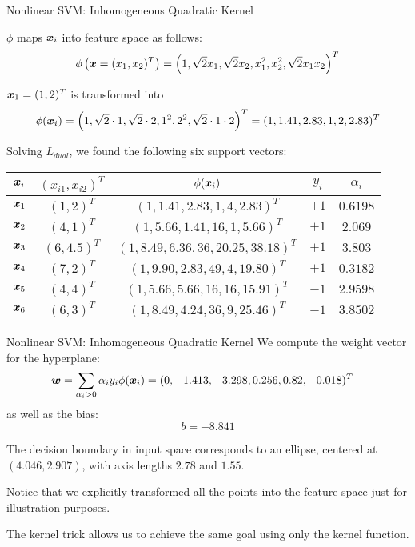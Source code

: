 \begin{frame}{Nonlinear SVM: Inhomogeneous Quadratic Kernel}

    $\phi$ maps ${\boldsymbol x}_i$ into feature space as follows:
    \begin{align*}
    \phi\left({\boldsymbol x} = (x_{1},x_{2})^T\right) = \left(1, \sqrt{2}x_{1},
    \sqrt{2}x_{2}, x_{1}^2, x_{2}^2, \sqrt{2}x_{1}x_{2}\right)^T
    \end{align*}

 ${\boldsymbol x}_1 = (1,2)^T$ is transformed into 
$$\phi({\boldsymbol x}_i) = \left(1, \sqrt{2}\cdot1, \sqrt{2}\cdot2, 1^2, 2^2, \sqrt{2}\cdot1\cdot2\right)^T = (1,1.41, 2.83, 1, 2, 2.83)^T$$


Solving $L_{dual}$, we found the following six support vectors:
    \begin{center}
    {\renewcommand{\arraystretch}{1.1}\begin{tabular}{|c||c|c||c|c|}
        \hline
        ${\boldsymbol x}_i$ & $(x_{i1}, x_{i2})^T$ & $\phi({\boldsymbol x}_i)$ & $y_i$ & $\alpha_i$\\
        \hline
          ${\boldsymbol x}_1$ & $(1,2)^T$ & $(1,1.41,2.83,1,4,2.83)^T$ & $+1$ & $0.6198$\\
          ${\boldsymbol x}_2$ & $(4,1)^T$ & $(1,5.66,1.41,16,1,5.66)^T$ & $+1$ & $2.069$\\
          ${\boldsymbol x}_3$ & $(6,4.5)^T$ & $(1,8.49,6.36,36,20.25,38.18)^T$ & $+1$ & $3.803$\\
          ${\boldsymbol x}_4$ & $(7,2)^T$ & $(1,9.90,2.83,49,4,19.80)^T$ & $+1$ & $0.3182$\\
          ${\boldsymbol x}_5$ & $(4,4)^T$ & $(1,5.66,5.66,16,16,15.91)^T$ & $-1$ & $2.9598$\\
          ${\boldsymbol x}_6$ & $(6,3)^T$ & $(1,8.49,4.24,36,9,25.46)^T$ & $-1$ & $3.8502$\\
        \hline
    \end{tabular}}\vspace*{6pt}
    \end{center}
\end{frame}

\begin{frame}{Nonlinear SVM: Inhomogeneous Quadratic Kernel}
 We compute the weight vector for the hyperplane:
\begin{align*}
    {\boldsymbol w} & = \displaystyle \sum_{\alpha_i > 0} \alpha_i y_i \phi({\boldsymbol x}_i)
    = (0,-1.413,-3.298,0.256,0.82,-0.018)^T
\end{align*}
as well as the bias:
    $$b = -8.841$$

The decision boundary in input space corresponds to an ellipse,
centered at $(4.046,2.907)$, with axis lengths $2.78$ and $1.55$. 

\medskip

Notice that we explicitly transformed all the points into the feature space just for illustration purposes.

\medskip

The kernel trick allows us to achieve the same goal using only the kernel function.


\end{frame}

